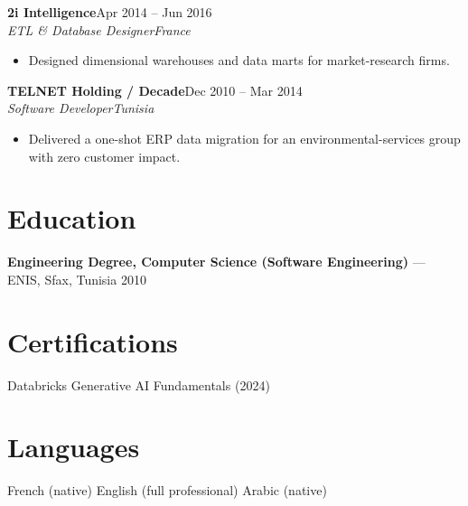 \documentclass[10pt,letterpaper]{article}
\newcommand{\job}[4]{\textbf{#1}\hfill #4\\ \textit{#2}\hfill\textit{#3}\par\vspace{2pt}}
\begin{document}
\vspace{4pt}
\job{2i Intelligence}{ETL \& Database Designer}{France}{Apr 2014 -- Jun 2016}
\begin{itemize}
\item Designed dimensional warehouses and data marts for market-research firms.
\end{itemize}

\vspace{4pt}
\job{TELNET Holding / Decade}{Software Developer}{Tunisia}{Dec 2010 -- Mar 2014}
\begin{itemize}
\item Delivered a one-shot ERP data migration for an environmental-services group with zero customer impact.
\end{itemize}

\section*{Education}
\textbf{Engineering Degree, Computer Science (Software Engineering)} --- ENIS, Sfax, Tunisia \hfill 2010

\section*{Certifications}
Databricks Generative AI Fundamentals (2024)

\section*{Languages}
French (native) \textperiodcentered{} English (full professional) \textperiodcentered{} Arabic (native)
\end{document}
